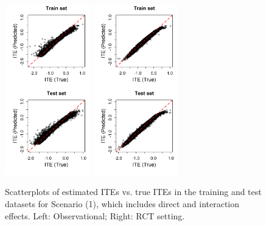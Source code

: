 \begin{figure}[htbp]
\centering
\includegraphics[width=0.33\textwidth]{img/results/observ_scenario1_ITE_scatter_train_test.png} 
\includegraphics[width=0.33\textwidth]{img/results/rct_scenario1_ITE_scatter_train_test.png}
\vspace{-17pt}
\caption{Scatterplots of estimated ITEs vs. true ITEs in the training and test datasets for Scenario (1), which includes direct and interaction effects. Left: Observational; Right: RCT setting.}
\label{fig:scenario1_ite_scatter_train_test}
\end{figure}



% 


